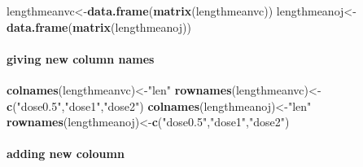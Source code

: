 \documentclass[]{article}
\newenvironment{Shaded}{\begin{snugshade}}{\end{snugshade}}
\newcommand{\KeywordTok}[1]{\textcolor[rgb]{0.13,0.29,0.53}{\textbf{#1}}}
\newcommand{\DecValTok}[1]{\textcolor[rgb]{0.00,0.00,0.81}{#1}}
\newcommand{\FloatTok}[1]{\textcolor[rgb]{0.00,0.00,0.81}{#1}}
\newcommand{\StringTok}[1]{\textcolor[rgb]{0.31,0.60,0.02}{#1}}
\newcommand{\OperatorTok}[1]{\textcolor[rgb]{0.81,0.36,0.00}{\textbf{#1}}}
\newcommand{\NormalTok}[1]{#1}
\let\oldparagraph\paragraph
\renewcommand{\paragraph}[1]{\oldparagraph{#1}\mbox{}}
\begin{document}
\begin{Shaded}
\begin{Highlighting}[]
\NormalTok{lengthmeanvc<-}\KeywordTok{data.frame}\NormalTok{(}\KeywordTok{matrix}\NormalTok{(lengthmeanvc))}
\NormalTok{lengthmeanoj<-}\KeywordTok{data.frame}\NormalTok{(}\KeywordTok{matrix}\NormalTok{(lengthmeanoj))}
\end{Highlighting}
\end{Shaded}

\paragraph{giving new column names}\label{giving-new-column-names}

\begin{Shaded}
\begin{Highlighting}[]
\KeywordTok{colnames}\NormalTok{(lengthmeanvc)<-}\StringTok{"len"}
\KeywordTok{rownames}\NormalTok{(lengthmeanvc)<-}\KeywordTok{c}\NormalTok{(}\StringTok{"dose0.5"}\NormalTok{,}\StringTok{"dose1"}\NormalTok{,}\StringTok{"dose2"}\NormalTok{)}
\KeywordTok{colnames}\NormalTok{(lengthmeanoj)<-}\StringTok{"len"}
\KeywordTok{rownames}\NormalTok{(lengthmeanoj)<-}\KeywordTok{c}\NormalTok{(}\StringTok{"dose0.5"}\NormalTok{,}\StringTok{"dose1"}\NormalTok{,}\StringTok{"dose2"}\NormalTok{)}
\end{Highlighting}
\end{Shaded}

\paragraph{adding new coloumn}\label{adding-new-coloumn}

\begin{Shaded}
\end{Shaded}
\end{document}
